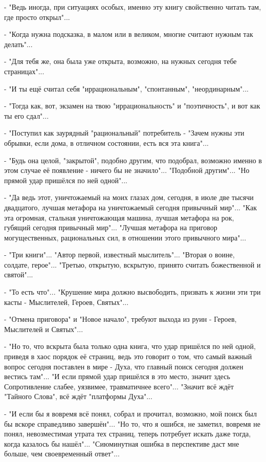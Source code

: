- "Ведь иногда, при ситуациях особых, именно эту книгу свойственно читать там,
где просто открыл"...

- "Когда нужна подсказка, в малом или в великом, многие считают нужным так
делать"...

- "Для тебя же, она была уже открыта, возможно, на нужных сегодня тебе
страницах"...

- "И ты ещё считал себя "иррациональным", "спонтанным", "неординарным"...

- "Тогда как, вот, экзамен на твою "иррациональность" и "поэтичность", и вот
как ты его сдал"...

- "Поступил как заурядный "рациональный" потребитель - "Зачем нужны эти
обрывки, если дома, в отличном состоянии, есть вся эта книга"...

- "Будь она целой, "закрытой", подобно другим, что подобрал, возможно именно в
этом случае её появление - ничего бы не значило"... "Подобной другим"... "Но
прямой удар пришёлся по ней одной"...

- "Да ведь этот, уничтожаемый на моих глазах дом, сегодня, в июле две тысячи
двадцатого, лучшая метафора на уничтожаемый сегодня привычный мир"... "Как эта
огромная, стальная уничтожающая машина, лучшая метафора на рок, губящий сегодня
привычный мир"... "Лучшая метафора на приговор могущественных, рациональных
сил, в отношении этого привычного мира"...

- "Три книги"... "Автор первой, известный мыслитель"... "Вторая о воине,
солдате, герое"... "Третью, открытую, вскрытую, принято считать божественной и
святой"...

- "То есть что"... "Крушение мира должно высвободить, призвать к жизни эти три
касты - Мыслителей, Героев, Святых"... 

- "Отмена приговора" и "Новое начало", требуют выхода из руин - Героев,
Мыслителей и Святых"...

- "Но то, что вскрыта была только одна книга, что удар пришёлся по ней одной,
приведя в хаос порядок её страниц, ведь это говорит о том, что самый важный
вопрос сегодня поставлен в мире - Духа, что главный поиск сегодня должен
вестись там"... "И если прямой удар пришёлся в это место, значит здесь
Сопротивление слабее, уязвимее, травматичнее всего"... "Значит всё ждёт
"Тайного Слова", всё ждёт "платформы Духа"...

- "И если бы я вовремя всё понял, собрал и прочитал, возможно, мой поиск был бы
вскоре справедливо завершён"... "Но то, что я ошибся, не заметил, вовремя не
понял, невозместимая утрата тех страниц, теперь потребует искать даже тогда,
когда казалось бы нашёл"... "Сиюминутная ошибка в перспективе даст мне больше,
чем своевременный ответ"...

